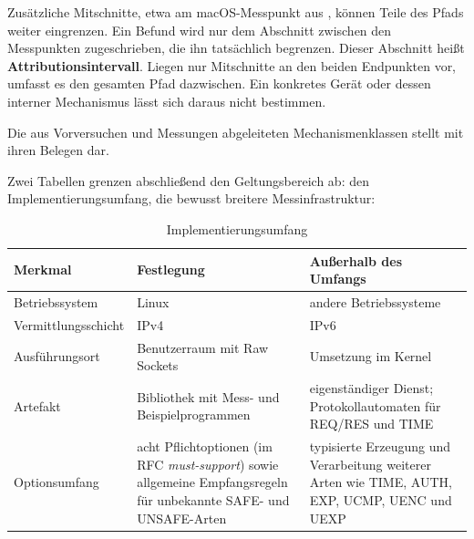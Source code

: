 Zusätzliche Mitschnitte, etwa am macOS-Messpunkt aus , können Teile des Pfads
weiter eingrenzen. Ein Befund wird nur dem Abschnitt zwischen den Messpunkten zugeschrieben, die ihn
tatsächlich begrenzen. Dieser Abschnitt heißt \textbf{Attributionsintervall}. Liegen nur Mitschnitte
an den beiden Endpunkten vor, umfasst es den gesamten Pfad dazwischen. Ein konkretes Gerät oder dessen
interner Mechanismus lässt sich daraus nicht bestimmen.

Die aus Vorversuchen und Messungen abgeleiteten Mechanismen\-klassen stellt  mit
ihren Belegen dar.

Zwei Tabellen grenzen abschließend den Geltungsbereich ab:  den
Implementierungsumfang,  die bewusst breitere Messinfrastruktur:

\begin{table}[H]
  \centering
  \caption{Implementierungsumfang}
  \label{tab:scope-implementierung}
  \small
  \begin{tabularx}{\textwidth}{@{}L{3.4cm}YY@{}}
    \toprule
    \textbf{Merkmal} & \textbf{Festlegung} & \textbf{Außerhalb des Umfangs} \\
    \midrule
    Betriebssystem   & Linux & andere Betriebssysteme \\
    Vermittlungsschicht & IPv4 & IPv6 \\
    Ausführungsort   & Benutzerraum mit Raw Sockets & Umsetzung im Kernel \\
    Artefakt         & Bibliothek mit Mess- und Beispielprogrammen & eigenständiger Dienst;
      Protokollautomaten für REQ/RES und TIME \\
    Optionsumfang    & acht Pflichtoptionen (im RFC \textit{must-support}) sowie allgemeine Empfangsregeln
      für unbekannte SAFE- und UNSAFE-Arten & typisierte Erzeugung und Verarbeitung weiterer Arten wie TIME, AUTH, EXP,
      UCMP, UENC und UEXP \\
    \bottomrule
  \end{tabularx}
\end{table}

